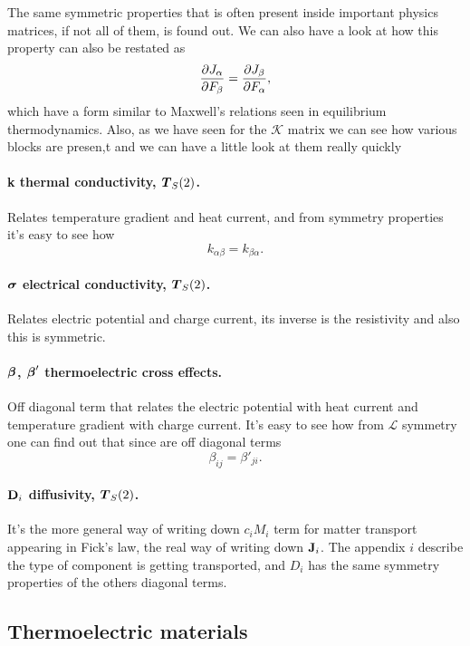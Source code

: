 \noindent
The same symmetric properties that is often present inside important physics matrices, if not all of them, is found out. We can also have a look at how this property can also be restated as
\begin{equation}
    \pdv{J_\alpha}{F_\beta} = \pdv{J_\beta}{F_\alpha},
\end{equation} 
which have a form similar to Maxwell's relations seen in equilibrium thermodynamics. Also, as we have seen for the $\mathcal{K}$ matrix we can see how various blocks are presen,t and we can have a little look at them really quickly

\paragraph{\bf k thermal conductivity, $\vb*{T}_S(2)$.} Relates temperature gradient and heat current, and from symmetry properties it's easy to see how
\begin{equation}
    k_{\alpha\beta} = k_{\beta\alpha}.
\end{equation}

\paragraph{$\vb*{\sigma}$ \bf electrical conductivity, $\vb*{T}_S(2)$.} Relates electric potential and charge current, its inverse is the resistivity and also this is symmetric.

\paragraph{$\vb*{\beta}$, $\vb*{\beta}'$ \bf thermoelectric cross effects.} Off diagonal term that relates the electric potential with heat current and temperature gradient with charge current. It's easy to see how from $\mathcal{L}$ symmetry one can find out that since are off diagonal terms
\begin{equation}
    \beta_{ij} = \beta'_{ji}.
\end{equation}

\paragraph{\bf $\vb{D}_i$ diffusivity, $\vb*{T}_S(2)$.} It's the more general way of writing down $c_i M_i$ term for matter transport appearing in Fick's law, the real way of writing down $\vb{J}_i$. The appendix $i$ describe the type of component is getting transported, and $D_i$ has the same symmetry properties of the others diagonal terms.

\subsection{Thermoelectric materials}